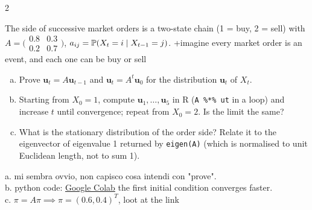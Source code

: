 \begin{paracol}{2}
\begin{exercise}\label{ex:ps1-3}
The side of successive market orders is a two-state chain (1 = buy, 2 = sell) with
$A=\bigl(\begin{smallmatrix}0.8&0.3\\0.2&0.7\end{smallmatrix}\bigr)$, $a_{ij}=\mathbb{P}(X_t=i\mid X_{t-1}=j)$. \note+{imagine every market order is an event, and each one can be buy or sell}
\begin{enumerate}[(a)]
  \item Prove $\bm u_t=A\bm u_{t-1}$ and $\bm u_t=A^t\bm u_0$ for the distribution $\bm u_t$ of $X_t$.
  \item Starting from $X_0=1$, compute $\bm u_1,\dots,\bm u_5$ in R (\texttt{A \%*\% ut} in a loop) and increase $t$
      until convergence; repeat from $X_0=2$. Is the limit the same?
  \item What is the stationary distribution of the order side? Relate it to the eigenvector of eigenvalue 1
      returned by \texttt{eigen(A)} (which is normalised to unit Euclidean length, not to sum 1).
\end{enumerate}
\end{exercise}
\begin{mysolution}
  a. mi sembra ovvio, non capisco cosa intendi con "prove". \\
  b. python code: \href{https://colab.research.google.com/drive/12kHBmkZoIjMLEpHWaKvVxB_bXrrVPTuB?usp=sharing}{Google Colab} the first initial condition converges faster. \\
  c. $\pi = A \pi \implies \pi = (0.6, 0.4)^T$, loot at the link
\end{mysolution}


\end{paracol}
